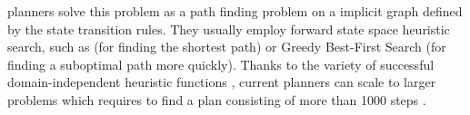 \sota planners solve this problem as a path finding problem on a
implicit graph defined by the state transition rules. They usually
employ forward state space heuristic search, such as \astar (for finding
the shortest path) or Greedy Best-First Search (for finding a suboptimal
path more quickly). Thanks to the variety of successful
domain-independent heuristic functions
\cite{Helmert2009,sievers2012efficient,helmert2007flexible,bonet2013admissible,hoffmann01,Helmert04,richter2008landmarks},
current \lsota planners can scale to larger problems which requires to
find a plan consisting of more than 1000 steps \cite{Asai2015}.


